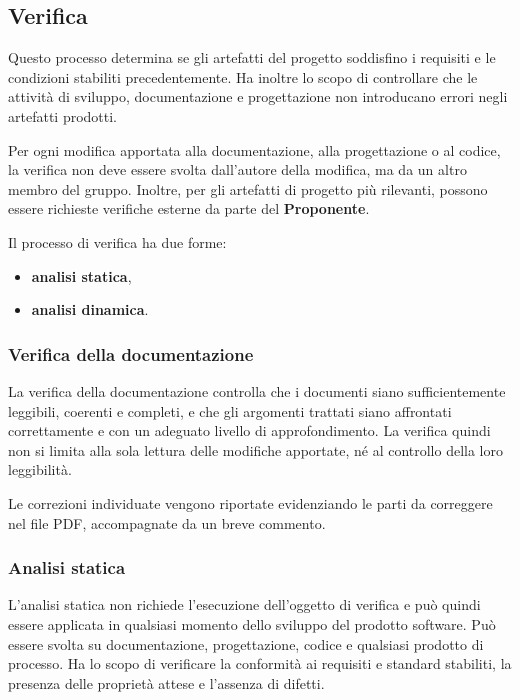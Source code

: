 \documentclass[12pt, a4paper]{article}
\begin{document}
\subsection{Verifica}

Questo processo determina se gli artefatti del progetto soddisfino i requisiti e le condizioni stabiliti precedentemente. Ha inoltre lo scopo di controllare che le attività di sviluppo, documentazione e progettazione non introducano errori negli artefatti prodotti.

Per ogni modifica apportata alla documentazione, alla progettazione o al codice, la verifica non deve essere svolta dall'autore della modifica, ma da un altro membro del gruppo. Inoltre, per gli artefatti di progetto più rilevanti, possono essere richieste verifiche esterne da parte del \textbf{Proponente}.

Il processo di verifica ha due forme:
\begin{itemize}
    \item \textbf{analisi statica},
    \item \textbf{analisi dinamica}.
\end{itemize}

\subsubsection{Verifica della documentazione}

La verifica della documentazione controlla che i documenti siano sufficientemente leggibili, coerenti e completi, e che gli argomenti trattati siano affrontati correttamente e con un adeguato livello di approfondimento. La verifica quindi non si limita alla sola lettura delle modifiche apportate, né al controllo della loro leggibilità.

Le correzioni individuate vengono riportate evidenziando le parti da correggere nel file PDF, accompagnate da un breve commento.


\subsubsection{Analisi statica}

L'analisi statica non richiede l'esecuzione dell'oggetto di verifica e può quindi essere applicata in qualsiasi momento dello sviluppo del prodotto software. Può essere svolta su documentazione, progettazione, codice e qualsiasi prodotto di processo. Ha lo scopo di verificare la conformità ai requisiti e standard stabiliti, la presenza delle proprietà attese e l'assenza di difetti.
\end{document}

